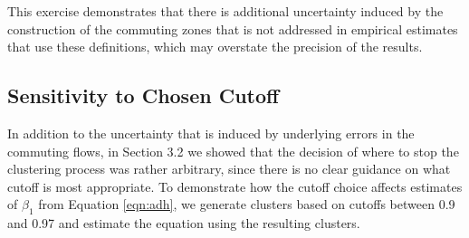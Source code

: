 This exercise demonstrates that there is additional uncertainty induced by the construction of the commuting zones that is not addressed in empirical estimates that use these definitions, which may overstate the precision of the results.

\subsection{Sensitivity to Chosen Cutoff}

In addition to the uncertainty that is induced by underlying errors in the commuting flows, in Section 3.2 we showed that the decision of where to stop the clustering process was rather arbitrary, since there is no clear guidance on what cutoff is most appropriate. To demonstrate how the cutoff choice affects estimates of $\beta_1$ from Equation \ref{eqn:adh}, we generate clusters based on cutoffs between 0.9 and 0.97 and estimate the equation using the resulting clusters.

